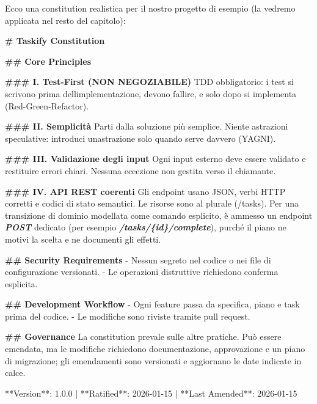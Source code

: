 \documentclass[
  italian,
  10pt,
]{book}
\newenvironment{Shaded}{\begin{snugshade}}{\end{snugshade}}
\newcommand{\FunctionTok}[1]{\textcolor[rgb]{0.13,0.29,0.53}{\textbf{#1}}}
\newcommand{\InformationTok}[1]{\textcolor[rgb]{0.56,0.35,0.01}{\textbf{\textit{#1}}}}
\newcommand{\NormalTok}[1]{#1}
\newcommand{\SpecialStringTok}[1]{\textcolor[rgb]{0.31,0.60,0.02}{#1}}
\begin{document}
Ecco una constitution realistica per il nostro progetto di esempio (la
vedremo applicata nel resto del capitolo):

\begin{Shaded}
\begin{Highlighting}[]
\FunctionTok{\# Taskify Constitution}

\FunctionTok{\#\# Core Principles}

\FunctionTok{\#\#\# I. Test{-}First (NON NEGOZIABILE)}
\NormalTok{TDD obbligatorio: i test si scrivono prima dell\textquotesingle{}implementazione,}
\NormalTok{devono fallire, e solo dopo si implementa (Red{-}Green{-}Refactor).}

\FunctionTok{\#\#\# II. Semplicità}
\NormalTok{Parti dalla soluzione più semplice. Niente astrazioni speculative:}
\NormalTok{introduci un\textquotesingle{}astrazione solo quando serve davvero (YAGNI).}

\FunctionTok{\#\#\# III. Validazione degli input}
\NormalTok{Ogni input esterno deve essere validato e restituire errori chiari.}
\NormalTok{Nessuna eccezione non gestita verso il chiamante.}

\FunctionTok{\#\#\# IV. API REST coerenti}
\NormalTok{Gli endpoint usano JSON, verbi HTTP corretti e codici di stato}
\NormalTok{semantici. Le risorse sono al plurale (/tasks).}
\NormalTok{Per una transizione di dominio modellata come comando esplicito, è}
\NormalTok{ammesso un endpoint }\InformationTok{\textasciigrave{}POST\textasciigrave{}}\NormalTok{ dedicato (per esempio }\InformationTok{\textasciigrave{}/tasks/\{id\}/complete\textasciigrave{}}\NormalTok{),}
\NormalTok{purché il piano ne motivi la scelta e ne documenti gli effetti.}

\FunctionTok{\#\# Security Requirements}
\SpecialStringTok{{-} }\NormalTok{Nessun segreto nel codice o nei file di configurazione versionati.}
\SpecialStringTok{{-} }\NormalTok{Le operazioni distruttive richiedono conferma esplicita.}

\FunctionTok{\#\# Development Workflow}
\SpecialStringTok{{-} }\NormalTok{Ogni feature passa da specifica, piano e task prima del codice.}
\SpecialStringTok{{-} }\NormalTok{Le modifiche sono riviste tramite pull request.}

\FunctionTok{\#\# Governance}
\NormalTok{La constitution prevale sulle altre pratiche. Può essere emendata, ma le}
\NormalTok{modifiche richiedono documentazione, approvazione e un piano di migrazione;}
\NormalTok{gli emendamenti sono versionati e aggiornano le date indicate in calce.}

\NormalTok{**Version**: 1.0.0 | **Ratified**: 2026{-}01{-}15 | **Last Amended**: 2026{-}01{-}15}
\end{Highlighting}
\end{Shaded}
\end{document}
